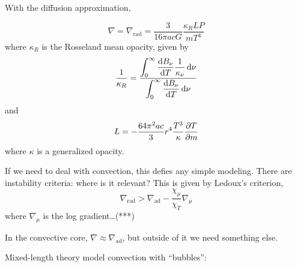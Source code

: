 \documentclass[main.tex]{subfiles}
\begin{document}
With the diffusion approximation,

\begin{equation}
    \nabla = \nabla_{\text{rad}} = \frac{3}{16 \pi a c G} \frac{\kappa_R L P}{mT^4}
\end{equation}
%
where \(\kappa_R\) is the Rosseland mean opacity, given by
%
\begin{equation}
  \frac{1}{\kappa_{R}} =
  \frac{ \displaystyle\int _{0}   ^{\infty}  \dv{B_\nu}{T} \frac{1}{\kappa_\nu} \dd{\nu}}
  {  \displaystyle \int _{0}   ^{\infty} \dv{B_\nu}{T} \dd{\nu}}
\end{equation}
%
and
%
\begin{equation}
    L = - \frac{64 \pi^2 a c }{3} r^4 \frac{T^3}{\kappa} \pdv{T}{m}
\end{equation}
%
where \(\kappa\) is a generalized opacity.

If we need to deal with convection, this defies any simple modeling. There are instability criteria: where is it relevant? This is given by
Ledoux's criterion,
%
\begin{equation}
    \nabla_{\text{rad}} > \nabla_{\text{ad}} - \frac{\chi_\mu}{\chi_T} \nabla_\mu
\end{equation}
%
where \(\nabla_\mu\) is the log gradient\dots (***)

In the convective core, \(\nabla \approx \nabla_{\text{ad}}\), but outside of it we need something else.

Mixed-length theory model convection with ``bubbles'':
\end{document}
